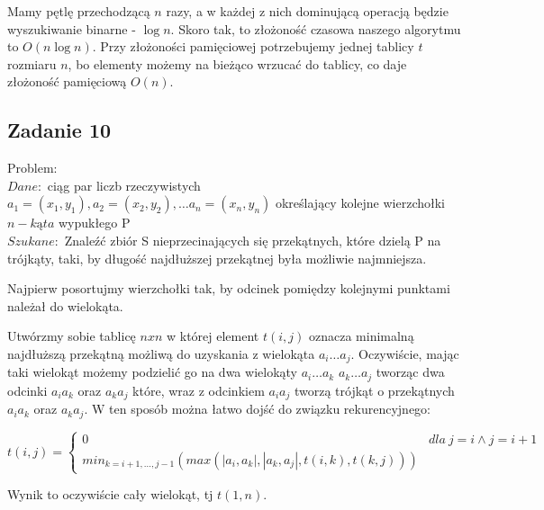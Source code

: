 \documentclass[a4paper]{article}
\begin{document}
Mamy pętlę przechodzącą $n$ razy, a w każdej z nich dominującą operacją będzie wyszukiwanie binarne - $\log{n}$. Skoro tak, to złożoność czasowa naszego algorytmu to $O(n\log{n})$. Przy złożoności pamięciowej potrzebujemy jednej tablicy $t$ rozmiaru $n$, bo elementy możemy na bieżąco wrzucać do tablicy, co daje złożoność pamięciową $O(n)$.

\subsection*{Zadanie 10}
Problem:\\
$Dane:$\hspace*{5ex} ciąg par liczb rzeczywistych $a_1=(x_1,y_1), a_2=(x_2,y_2), \dots a_n=(x_n,y_n)$ określający kolejne wierzchołki $n-kąta$ wypukłego P	\\
$Szukane:$\hspace*{5ex} Znaleźć zbiór S nieprzecinających się przekątnych, które dzielą P na trójkąty, taki, by długość najdłuższej przekątnej była możliwie najmniejsza.

\clearpage
Najpierw posortujmy wierzchołki tak, by odcinek pomiędzy kolejnymi punktami należał do wielokąta.

Utwórzmy sobie tablicę $nxn$ w której element $t(i,j)$ oznacza minimalną najdłuższą przekątną możliwą do uzyskania z wielokąta $a_i\dots a_j$. Oczywiście, mając taki wielokąt możemy podzielić go na dwa wielokąty $a_i\dots a_k$ $a_k\dots a_j$ tworząc dwa odcinki $a_i a_k$ oraz $a_k a_j$ które, wraz z odcinkiem $a_i a_j$ tworzą trójkąt o przekątnych $a_i a_k$ oraz $a_k a_j$. W ten sposób można łatwo dojść do związku rekurencyjnego:  

$$t(i,j) = \left\{\begin{matrix}
0 & dla\ j=i \wedge j=i+1\\
min_{k=i+1,\dots ,j-1}\left( max(|a_i, a_k|, |a_k, a_j|, t(i,k), t(k,j)) \right) 
\end{matrix}\right.$$

Wynik to oczywiście cały wielokąt, tj $t(1,n)$.
\end{document}
